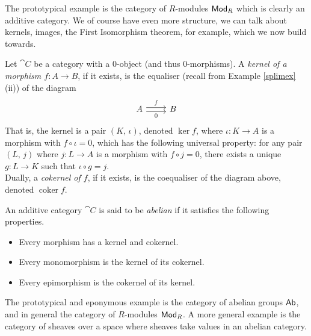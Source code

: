\begin{example}
The prototypical example is the category of $R$-modules $\mathsf{Mod}_R$ which is clearly an additive category. We of course have even more structure, we can talk about kernels, images, the First Isomorphism theorem, for example, which we now build towards.
\end{example}

\vspace*{0.1in}

\begin{definition}
Let $\cat{C}$ be a category with a $0$-object (and thus $0$-morphisms). A \emph{kernel of a morphism $f: A \to B$}, if it exists, is the equaliser (recall from Example \ref{splimex} (ii)) of the diagram
\[\begin{tikzcd}
A \arrow[r, "f", shift left] \arrow[r, "0"', shift right] & B
\end{tikzcd}\]
That is, the kernel is a pair $(K,\,\iota)$, denoted $\ker f$, where $\iota:K \to A$ is a morphism with $f\circ\iota = 0$, which has the following universal property: for any pair $(L,\,j)$ where $j:L \to A$ is a morphism with $f\circ j = 0$, there exists a unique $g:L \to K$ such that $\iota\circ g = j$.\\[1em]
Dually, a \emph{cokernel of $f$}, if it exists, is the coequaliser of the diagram above, denoted  $\operatorname{coker} f$.
\end{definition}

\vspace*{0.1in}

\begin{definition}
An additive category $\cat{C}$ is said to be \emph{abelian} if it satisfies the following properties.
\begin{itemize}
\item Every morphism has a kernel and cokernel.
\item Every monomorphism is the kernel of its cokernel.
\item Every epimorphism is the cokernel of its kernel.
\end{itemize}
\end{definition}

\vspace*{0.1in}

\begin{example}
The prototypical and eponymous example is the category of abelian groups $\mathsf{Ab}$, and in general the category of $R$-modules $\mathsf{Mod}_R$. A more general example is the category of sheaves over a space where sheaves take values in an abelian category.
\end{example}

